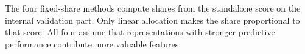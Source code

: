 



The four fixed-share methods compute shares from the standalone score on the internal validation part. Only linear allocation makes the share proportional to that score. All four assume that representations with stronger predictive performance contribute more valuable features.




